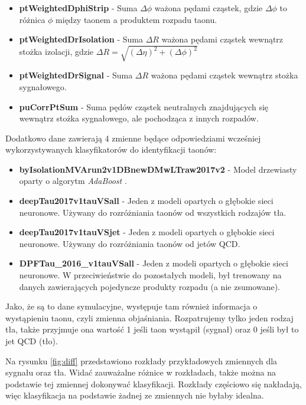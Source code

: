 \documentclass{pracalicmgr}
\begin{document}
\begin{itemize}
	\item \textbf{ptWeightedDphiStrip} - Suma $\Delta\phi$ ważona pędami cząstek, gdzie $\Delta\phi$ to różnica $\phi$ między taonem a produktem rozpadu taonu.
	\item \textbf{ptWeightedDrIsolation} - Suma $\Delta R$ ważona pędami cząstek wewnątrz stożka izolacji, gdzie $\Delta R = \sqrt{(\Delta\eta)^2 + (\Delta\phi)^2}$
	\item \textbf{ptWeightedDrSignal} - Suma $\Delta R$ ważona pędami cząstek wewnątrz stożka sygnałowego.
	\item \textbf{puCorrPtSum} - Suma pędów cząstek neutralnych znajdujących się wewnątrz stożka sygnałowego, ale pochodząca z innych rozpadów.
	\end{itemize}
	
	Dodatkowo dane zawierają 4 zmienne będące odpowiedziami wcześniej wykorzystywanych klasyfikatorów do identyfikacji taonów:
	\begin{itemize}
	\item \textbf{byIsolationMVArun2v1DBnewDMwLTraw2017v2} - Model drzewiasty oparty o algorytm \textit{AdaBoost} \cite{freund1997decision}.
	\item \textbf{deepTau2017v1tauVSall} - Jeden z modeli opartych o głębokie sieci neuronowe. Używany do rozróżniania taonów od wszystkich rodzajów tła.
	\item \textbf{deepTau2017v1tauVSjet} - Jeden z modeli opartych o głębokie sieci neuronowe. Używany do rozróżniania taonów od jetów QCD.
	\item \textbf{DPFTau\_2016\_v1tauVSall} - Jeden z modeli opartych o głębokie sieci neuronowe. W przeciwieństwie do pozostałych modeli, był trenowany na danych zawierających pojedyncze produkty rozpadu (a nie zsumowane).
	\end{itemize}
	
	Jako, że są to dane symulacyjne, występuje tam również informacja o wystąpieniu taonu, czyli zmienna objaśniania. Rozpatrujemy tylko jeden rodzaj tła, także przyjmuje ona wartość 1 jeśli taon wystąpił (sygnał) oraz 0 jeśli był to jet QCD (tło).
	
	Na rysunku \ref{fig:diff} przedstawiono rozkłady przykładowych zmiennych dla sygnału oraz tła. Widać zauważalne różnice w rozkładach, także można na podstawie tej zmiennej dokonywać klasyfikacji. Rozkłady częściowo się nakładają, więc klasyfikacja na podstawie żadnej ze zmiennych nie byłaby idealna.
	
\end{document}
